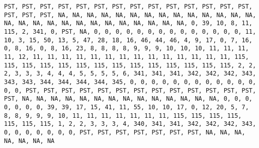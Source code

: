 \documentclass[]{article}
\begin{document}
\begin{verbatim}
PST, PST, PST, PST, PST, PST, PST, PST, PST, PST, PST, PST, PST, PST, PST, PST, PST, NA, NA, NA, NA, NA, NA, NA, NA, NA, NA, NA, NA, NA, NA, NA, NA, NA, NA, NA, NA, NA, NA, NA, NA, NA, NA, NA, 0, 39, 10, 8, 11, 115, 2, 341, 0, PST, NA, 0, 0, 0, 0, 0, 0, 0, 0, 0, 0, 0, 0, 0, 0, 11, 10, 3, 15, 50, 13, 5, 47, 28, 18, 16, 46, 44, 46, 4, 9, 17, 0, 7, 16, 0, 8, 16, 0, 8, 16, 23, 8, 8, 8, 8, 9, 9, 9, 10, 10, 10, 11, 11, 11, 11, 12, 11, 11, 11, 11, 11, 11, 11, 11, 11, 11, 11, 11, 11, 11, 115, 115, 115, 115, 115, 115, 115, 115, 115, 115, 115, 115, 115, 115, 2, 2, 2, 3, 3, 3, 4, 4, 4, 5, 5, 5, 5, 6, 341, 341, 341, 342, 342, 342, 343, 343, 343, 344, 344, 344, 344, 345, 0, 0, 0, 0, 0, 0, 0, 0, 0, 0, 0, 0, 0, 0, PST, PST, PST, PST, PST, PST, PST, PST, PST, PST, PST, PST, PST, PST, NA, NA, NA, NA, NA, NA, NA, NA, NA, NA, NA, NA, NA, NA, 0, 0, 0, 0, 0, 0, 0, 39, 39, 17, 15, 41, 11, 55, 10, 10, 17, 0, 12, 20, 5, 7, 8, 8, 9, 9, 9, 10, 11, 11, 11, 11, 11, 11, 11, 115, 115, 115, 115, 115, 115, 115, 1, 2, 2, 3, 3, 3, 4, 340, 341, 341, 342, 342, 342, 343, 0, 0, 0, 0, 0, 0, 0, PST, PST, PST, PST, PST, PST, PST, NA, NA, NA, NA, NA, NA, NA

\end{verbatim}
\end{document}
